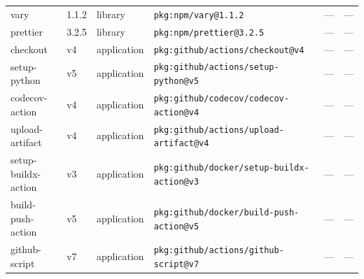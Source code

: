 \documentclass[11pt,a4paper]{article}
\begin{document}
\begin{longtable}{|p{4cm}|p{2cm}|p{1.6cm}|p{5cm}|p{1.5cm}|p{3.5cm}|}
\raggedright vary & 1.1.2 & library & \small\texttt{pkg:npm/vary@1.1.2} & — & \small — \\
\raggedright prettier & 3.2.5 & library & \small\texttt{pkg:npm/prettier@3.2.5} & — & \small — \\
\raggedright checkout & v4 & application & \small\texttt{pkg:github/actions/checkout@v4} & — & \small — \\
\raggedright setup-python & v5 & application & \small\texttt{pkg:github/actions/setup-python@v5} & — & \small — \\
\raggedright codecov-action & v4 & application & \small\texttt{pkg:github/codecov/codecov-action@v4} & — & \small — \\
\raggedright upload-artifact & v4 & application & \small\texttt{pkg:github/actions/upload-artifact@v4} & — & \small — \\
\raggedright setup-buildx-action & v3 & application & \small\texttt{pkg:github/docker/setup-buildx-action@v3} & — & \small — \\
\raggedright build-push-action & v5 & application & \small\texttt{pkg:github/docker/build-push-action@v5} & — & \small — \\
\raggedright github-script & v7 & application & \small\texttt{pkg:github/actions/github-script@v7} & — & \small — \\
\end{longtable}
\end{document}
